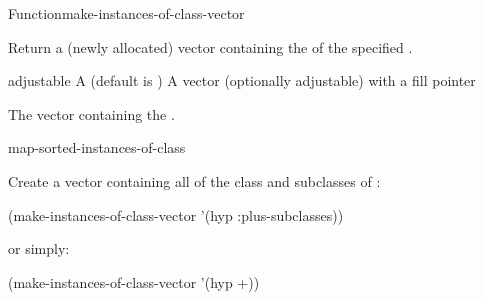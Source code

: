 \documentclass[10pt,twoside,english,pdftex]{article}
\begin{document}

\begin{functiondoc}{Function}{make-instances-of-class-vector}%
  {
    }

%
%

\fnsyntax

\fnpurpose Return a (newly allocated) vector containing the
 of the specified .

\fnpackage {}

\fnmodule {}

\fnargs
\begin{args}{adjustable}
\arg[adjustable] A  (default is \nil)
\arg[vector] A vector (optionally adjustable) with a fill pointer
\end{args}

\fnreturns The vector containing the .

\fndsyntax
\W\supp\tabletop
\unitclassesspec
\subclassingspec

\begin{alsos}{map-sorted-instances-of-class}
\end{alsos}

\fnexample
Create a vector containing all  of the class 
and subclasses of :
%
\W\supp
\begin{example}
  (make-instances-of-class-vector '(hyp :plus-subclasses))
\end{example} 
%
or simply:
%
\W\supp\notpretop
\begin{example}
  (make-instances-of-class-vector '(hyp +))
\end{example} 

\end{functiondoc}

\end{document}

